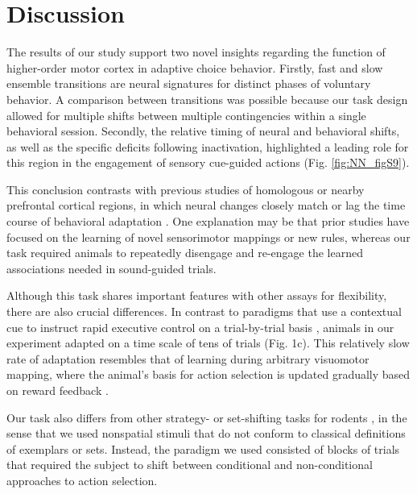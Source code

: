 \section{Discussion}

The results of our study support two novel insights regarding the function of higher-order motor cortex in adaptive choice behavior. Firstly, fast and slow ensemble transitions are neural signatures for distinct phases of voluntary behavior. A comparison between transitions was possible because our task design allowed for multiple shifts between multiple contingencies within a single behavioral session. Secondly, the relative timing of neural and behavioral shifts, as well as the specific deficits following inactivation, highlighted a leading role for this region in the engagement of sensory cue-guided actions (Fig. \ref{fig:NN_figS9}). 



This conclusion contrasts with previous studies of homologous or nearby prefrontal cortical regions, in which neural changes closely match or lag the time course of behavioral adaptation \citep{mitz1991learning,pasupathy2005different,durstewitz2010abrupt}. One explanation may be that prior studies have focused on the learning of novel sensorimotor mappings or new rules, whereas our task required animals to repeatedly disengage and re-engage the learned associations needed in sound-guided trials. 

Although this task shares important features with other assays for flexibility, there are also crucial differences. In contrast to paradigms that use a contextual cue to instruct rapid executive control on a trial-by-trial basis \citep{mante2013context,stokes2013dynamic,duan2015requirement}, animals in our experiment adapted on a time scale of tens of trials (Fig. 1c). This relatively slow rate of adaptation resembles that of learning during arbitrary visuomotor mapping, where the animal's basis for action selection is updated gradually based on reward feedback \citep{pasupathy2005different,asaad1998neural}. 

Our task also differs from other strategy- or set-shifting tasks for rodents \citep{durstewitz2010abrupt,darrah2008interaction}, in the sense that we used nonspatial stimuli that do not conform to classical definitions of exemplars or sets. Instead, the paradigm we used consisted of blocks of trials that required the subject to shift between conditional and non-conditional approaches to action selection. 

